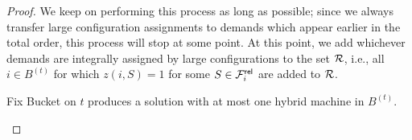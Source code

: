 \documentclass{article}[11pt]
\newcommand{\barD}{{\bar D}}
\newcommand{\brt}{{(t)}}
\begin{document}
\begin{proof}
	
	We keep on performing this process as long as possible; since we always transfer large configuration assignments to demands which appear earlier in the total order, this process will stop at some point. At this point, we add whichever demands are integrally assigned by large configurations to 
	the set ${\cal R}$, i.e., all $i \in B^\brt$ for which   $z(i,S) = 1$ for some $S\in {\cal F}^{\mathsf{rel}}_i$ are added to ${\cal R}$.
%	
%	
\begin{claim}\label{clm:step2}
	Fix Bucket on $t$ produces a solution with at most one hybrid machine in $B^\brt$.
\end{claim}
	





\end{proof}
\end{document}
